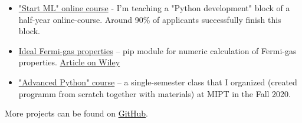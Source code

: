 \begin{itemize}
    \item \href{https://karpov.courses/ml-start}{"Start ML" online course} - I'm teaching a "Python development" block of a half-year online-course.
    Around 90\% of applicants successfully finish this block.
    \item \href{https://github.com/alekseik1/ifg-py}{Ideal Fermi-gas properties} -- pip module for numeric calculation of Fermi-gas properties. \href{http://dx.doi.org/10.1002/ctpp.202100139}{Article on Wiley}
    \item \href{https://github.com/alekseik1/advanced_python_1sem_2020}{"Advanced Python" course} -- a single-semester class that I organized (created programm from scratch together with materials) at MIPT in the Fall 2020.
\end{itemize}
More projects can be found on \href{https://github.com/alekseik1/}{GitHub}.
